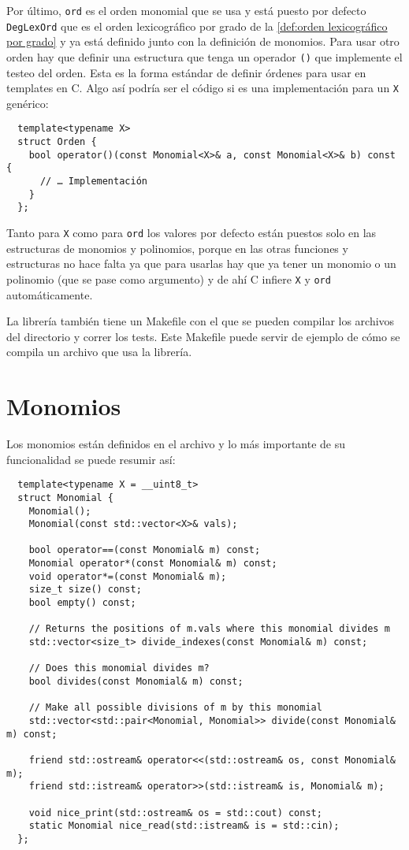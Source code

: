 \documentclass[12pt]{report}
\theoremstyle{customstyle}
\theoremstyle{factstyle}
\newcommand\cpp{C\nolinebreak[4]\hspace{-.05em}\raisebox{.4ex}{\relsize{-3}{\textbf{++}}}\xspace}
\begin{document}
Por último, \texttt{ord} es el orden monomial que se usa y está puesto por defecto \texttt{DegLexOrd} que es el orden lexicográfico por grado de la \cref{def:orden lexicográfico por grado} y ya está definido junto con la definición de monomios. Para usar otro orden hay que definir una estructura que tenga un operador \texttt{()} que implemente el testeo del orden. Esta es la forma estándar de definir órdenes para usar en templates en \cpp. Algo así podría ser el código si es una implementación para un \texttt{X} genérico:

\begin{verbatim}
  template<typename X>
  struct Orden {
    bool operator()(const Monomial<X>& a, const Monomial<X>& b) const {
      // … Implementación
    }
  };
\end{verbatim}

Tanto para \texttt{X} como para \texttt{ord} los valores por defecto están puestos solo en las estructuras de monomios y polinomios, porque en las otras funciones y estructuras no hace falta ya que para usarlas hay que ya tener un monomio o un polinomio (que se pase como argumento) y de ahí \cpp infiere \texttt{X} y \texttt{ord} automáticamente.

La librería también tiene un Makefile con el que se pueden compilar los archivos del directorio  y correr los tests. Este Makefile puede servir de ejemplo de cómo se compila un archivo que usa la librería.

\section{Monomios}

Los monomios están definidos en el archivo  y lo más importante de su funcionalidad se puede resumir así:

\begin{verbatim}
  template<typename X = __uint8_t>
  struct Monomial {
    Monomial();
    Monomial(const std::vector<X>& vals);

    bool operator==(const Monomial& m) const;
    Monomial operator*(const Monomial& m) const;
    void operator*=(const Monomial& m);
    size_t size() const;
    bool empty() const;

    // Returns the positions of m.vals where this monomial divides m
    std::vector<size_t> divide_indexes(const Monomial& m) const;

    // Does this monomial divides m?
    bool divides(const Monomial& m) const;

    // Make all possible divisions of m by this monomial
    std::vector<std::pair<Monomial, Monomial>> divide(const Monomial& m) const;

    friend std::ostream& operator<<(std::ostream& os, const Monomial& m);
    friend std::istream& operator>>(std::istream& is, Monomial& m);

    void nice_print(std::ostream& os = std::cout) const;
    static Monomial nice_read(std::istream& is = std::cin);
  };
\end{verbatim}
\end{document}
